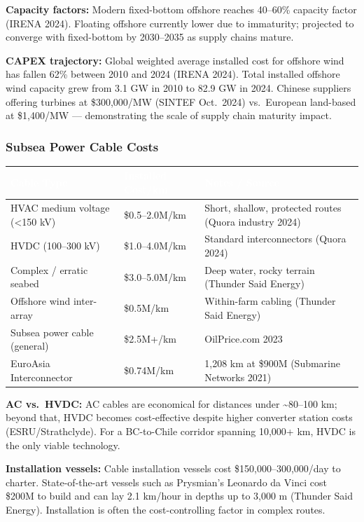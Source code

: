 \documentclass[11pt,letterpaper]{article}
\newcommand{\tableheader}[1]{\textbf{\sffamily\textcolor{white}{#1}}}
\begin{document}
\textbf{Capacity factors:} Modern fixed-bottom offshore reaches 40--60\% capacity factor
(IRENA 2024). Floating offshore currently lower due to immaturity; projected to converge
with fixed-bottom by 2030--2035 as supply chains mature.

\textbf{CAPEX trajectory:} Global weighted average installed cost for offshore wind has fallen
62\% between 2010 and 2024 (IRENA 2024). Total installed offshore wind capacity grew from
3.1 GW in 2010 to 82.9 GW in 2024. Chinese suppliers offering turbines at \$300,000/MW (SINTEF
Oct.\ 2024) vs.\ European land-based at \$1,400/MW --- demonstrating the scale of supply chain
maturity impact.

\subsubsection{Subsea Power Cable Costs}

\begin{center}
\begin{tabularx}{\textwidth}{L{4cm}C{3cm}X}
\toprule
{}
\tableheader{Cable Type} & \tableheader{Installed Cost/km} & \tableheader{Notes / Source} \\
\midrule
HVAC medium voltage (\textless{}150 kV) & \$0.5--2.0M/km & Short, shallow, protected routes (Quora industry 2024) \\
HVDC (\textpm{}100--300 kV) & \$1.0--4.0M/km & Standard interconnectors (Quora 2024) \\
Complex / erratic seabed & \$3.0--5.0M/km & Deep water, rocky terrain (Thunder Said Energy) \\
Offshore wind inter-array & \$0.5M/km & Within-farm cabling (Thunder Said Energy) \\
Subsea power cable (general) & \$2.5M+/km & OilPrice.com 2023 \\
EuroAsia Interconnector & \$0.74M/km & 1,208 km at \$900M (Submarine Networks 2021) \\
\bottomrule
\end{tabularx}
\end{center}

\textbf{AC vs.\ HVDC:} AC cables are economical for distances under \textasciitilde{}80--100 km; beyond
that, HVDC becomes cost-effective despite higher converter station costs (ESRU/Strathclyde).
For a BC-to-Chile corridor spanning 10,000+ km, HVDC is the only viable technology.

\textbf{Installation vessels:} Cable installation vessels cost \$150,000--300,000/day to charter.
State-of-the-art vessels such as Prysmian's Leonardo da Vinci cost \$200M to build and can
lay 2.1 km/hour in depths up to 3,000 m (Thunder Said Energy). Installation is often the
cost-controlling factor in complex routes.
\end{document}
